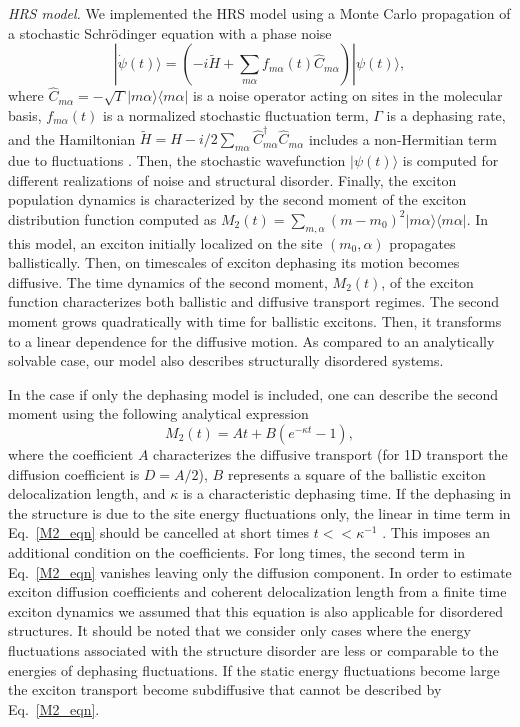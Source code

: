 \documentclass[journal=jacs,manuscript=article]{achemso}
\begin{document}
\textit{HRS model.} We implemented the HRS model using a Monte Carlo propagation\cite{Molmer1993,Stephanie_JCP12} of a stochastic Schr\"odinger equation\cite{kampen2007} with a phase noise
\begin{equation}
    |\dot{\psi}(t)\rangle = (-i \tilde{H} + \sum_{m \alpha}f_{m \alpha}(t)\hat{C}_{m \alpha}) |\psi(t)\rangle,
    \label{Schrod}
\end{equation}
where $\hat{C}_{m \alpha} = -\sqrt{\Gamma}|m\alpha\rangle\langle m\alpha|$ is a noise operator acting on sites in the molecular basis, $f_{m \alpha}(t)$ is a normalized stochastic fluctuation term, $\Gamma$ is a dephasing rate, and the Hamiltonian $\tilde{H} = H - i/2\sum_{m\alpha}\hat{C}_{m \alpha}^\dagger\hat{C}_{m \alpha}$ includes a non-Hermitian term due to fluctuations \cite{Molmer1993}. Then, the stochastic wavefunction $|\psi(t)\rangle$ is computed for different realizations of noise and structural disorder. Finally, the exciton population dynamics is characterized by the second moment of the exciton distribution function computed as $M_2(t) = \sum_{m,\alpha} (m-m_0)^2 |m\alpha\rangle\langle m\alpha|$. In this model, an exciton initially localized on the site $(m_0,\alpha)$ propagates ballistically. Then, on timescales of exciton dephasing its motion becomes diffusive. The time dynamics of the second moment, $M_2(t)$, of the exciton function characterizes both ballistic and diffusive transport regimes. The second moment grows quadratically with time for ballistic excitons. Then, it transforms to a linear dependence for the diffusive motion.\cite{Reineker_ZfP1973,Stephanie_JCP12} As compared to an analytically solvable case,\cite{Reineker_ZfP1973} our model also describes structurally disordered systems.

In the case if only the dephasing model is included, one can describe the second moment using the following analytical expression
\begin{equation}
    M_2(t) = At + B(e^{-\kappa t}-1),
    \label{M2_eqn}
\end{equation}
where the coefficient $A$ characterizes the diffusive transport (for 1D transport the diffusion coefficient is $D=A/2$), $B$ represents a square of the ballistic exciton delocalization length, and $\kappa$ is a characteristic dephasing time. If the dephasing in the structure is due to the site energy fluctuations only, the linear in time term in Eq.~\ref{M2_eqn} should be cancelled at short times $t<<\kappa^{-1}$ . This imposes an additional condition on the coefficients. For long times, the second term in Eq.~\ref{M2_eqn} vanishes leaving only the diffusion component. In order to estimate exciton diffusion coefficients and coherent delocalization length from a finite time exciton dynamics we assumed that this equation is also applicable for disordered structures. It should be noted that we consider only cases where the energy fluctuations associated with the structure disorder are less or comparable to the energies of dephasing fluctuations. If the static energy fluctuations become large the exciton transport become subdiffusive that cannot be described by Eq.~\ref{M2_eqn}.
\end{document}
